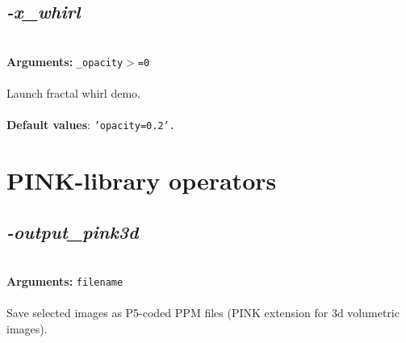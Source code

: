 \documentclass[a4paper,11pt,twoside]{book}
\begin{document}
\subsection{\emph{-x\_whirl} }\vspace*{-0.5em}
~\\\textbf{Arguments: } 
{\small \texttt{\_opacity$>$=0}}\\~\\
Launch fractal whirl demo.
~\\~\\\textbf{Default values}: {\small \texttt{'opacity=0.2'.}}

\section{PINK-library operators}


\subsection{\emph{-output\_pink3d} }\vspace*{-0.5em}
~\\\textbf{Arguments: } 
{\small \texttt{filename}}\\~\\
Save selected images as P5-coded PPM files (PINK extension for 3d volumetric images).
\end{document}
